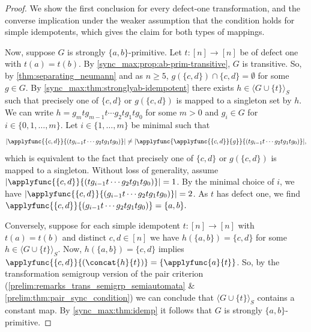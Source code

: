 \begin{proof} %
	We show the first conclusion for every defect-one transformation, %
	and the converse implication under the weaker assumption
	that the condition holds for simple idempotents, which gives
	the claim for  both types of mappings.	
	
	Now, suppose $G$ is strongly $\{a,b\}$-primitive.
	Let $t \colon [n] \to [n]$ be of defect one
	with $t(a) = t(b)$.
	By \cref{sync_max:prop:ab-prim-transitive}, $G$ is transitive.
	So, by \cref{thm:separating_neumann}
	and as $n \ge 5$,
	$g(\{c,d\}) \cap \{c,d\} = \emptyset$ for some $g \in G$.
	By \cref{sync_max:thm:stronglyab-idempotent}
    there exists $h \in \langle G \cup \{t\} \rangle_S$
    such that precisely one of $\{c,d\}$ or $g(\{c,d\})$
    is mapped to a singleton set by $h$.
	We can write 
	$
	h = g_m t g_{m-1} t \cdots g_2 t g_1 t g_0  
	$
	for some $m > 0$ and $g_i \in G$ for $i \in \{0,1,\ldots,m\}$.
    Let $i \in \{1,\ldots,m\}$ be minimal such that
	\[
	|\applyfunc{\{c,d\}}{(t g_{i-1} t \cdots g_2 t g_1 t g_0)}|
	\ne
	|\applyfunc{\applyfunc{\{c,d\}}{g}}{(t g_{i-1} t \cdots g_2 t g_1 t g_0)}|,
	\]
	which is equivalent to the fact
	that precisely one of $\{c,d\}$ or $g(\{c,d\})$ is mapped to a singleton.
	Without loss of generality, 
	assume $|\applyfunc{\{c,d\}}{(t g_{i-1} t \cdots g_2 t g_1 t g_0)}| = 1$.
	By the minimal choice of $i$, 
	we have $|\applyfunc{\{c,d\}}{(g_{i-1} t \cdots g_2 t g_1 t g_0)}| = 2$.
	As $t$ has defect one, we find
	$
	\applyfunc{\{c,d\}}{(g_{i-1} t \cdots g_2 t g_1 t g_0)} = \{a,b\}.
	$	
	
    Conversely, suppose for each simple idempotent $t \colon [n] \to [n]$
    with $t(a) = t(b)$ and distinct $c,d \in [n]$
    we have $h(\{a,b\}) = \{c,d\}$ for some $h \in \langle G \cup \{t\} \rangle_S$.
    Now,  $h(\{a,b\}) = \{c,d\}$
    implies $\applyfunc{\{c,d\}}{(\concat{h}{t})} = \{ \applyfunc{a}{t} \}$.
    So,  by the transformation semigroup version 
    of the pair criterion (\cref{prelim:remarks_trans_semigrp_semiautomata} \& \cref{prelim:thm:pair_sync_condition})
    we can conclude that $\langle G \cup \{t\} \rangle_S$ contains a constant map. By \cref{sync_max:thm:idemp} 
    it follows that $G$ is strongly $\{a,b\}$-primitive.    
\end{proof}
  
